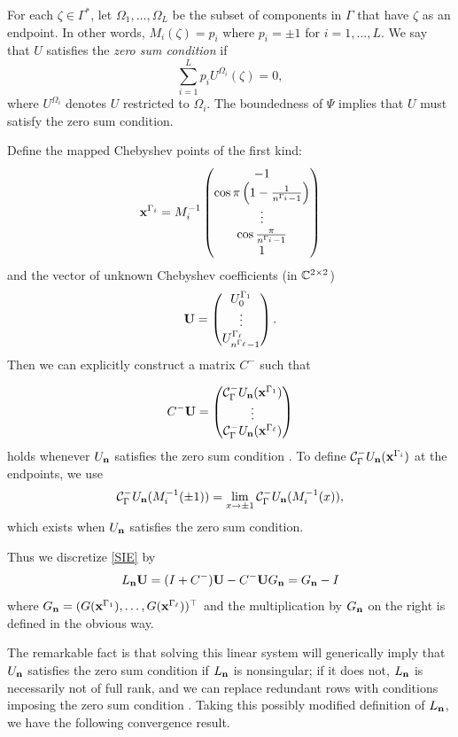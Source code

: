 \documentclass[11pt,fleqn]{article}
\numberwithin{equation}{section}
\begin{document}
  For each $\zeta \in \Gamma^*$, let $\Omega_1,\ldots,\Omega_L$ be the subset of components in
  $\Gamma$ that have $\zeta$ as an endpoint.  In other words,
  $M_i(\zeta) = p_i$ where $p_i = \pm 1$ for $i=1,\ldots, L$.
    We say that $U$ satisfies the {\it zero sum condition} if
    $$\sum_{i=1}^L p_i U^{\Omega_i}(\zeta) = 0,$$
%
where $U^{\Omega_i}$ denotes $U$ restricted to $\Omega_i$.
    The boundedness of $\Psi$ implies that $U$ must satisfy the zero sum condition.

Define the mapped Chebyshev points of the first kind:
%
    $${\bf x}^{\Gamma_i} = M_i^{-1}\begin{pmatrix}-1\cr\cos{\pi\left(1 - {1 \over n^{\Gamma_i}-1}\right)}\cr\vdots\cr\cos{\pi \over n^{\Gamma_i}-1}\cr1\end{pmatrix}$$
%
and the vector of
unknown Chebyshev coefficients (in ${\Bbb C}^{2 \times 2}$)
%
    $${\bf U} = \begin{pmatrix}U_0^{\Gamma_1}  \cr \vdots \cr U_{n^{\Gamma_\ell}-1}^{\Gamma_\ell} \end{pmatrix}.$$
%
Then we can explicitly construct a matrix $C^-$ such that

%
    $$C^-{\bf U} = \begin{pmatrix} {\cal C}_{\Gamma}^- U_{\bf n}({\bf x}^{\Gamma_1}) \cr \vdots \cr {\cal C}_{\Gamma}^-  U_{\bf n}({\bf x}^{\Gamma_\ell})\end{pmatrix}$$
holds whenever $U_{\bf n}$ satisfies the zero sum condition \cite{SORHFramework}.  To define ${\cal C}_{\Gamma}^- U_{\bf n}({\bf x}^{\Gamma_i})$ at the endpoints, we use
%
    $${\cal C}_{\Gamma}^- U_{\bf n}(M_{i}^{-1}(\pm 1)) = \lim_{x \rightarrow \pm 1} {\cal C}_{\Gamma}^- U_{\bf n}(M_i^{-1}(x)),$$
%
which exists when $U_{\bf n}$ satisfies the zero sum condition.


Thus we discretize \eqref{SIE} by
%
    $${ L}_{\bf n} {\bf U} = (I + C^-) {\bf U} - C^-{\bf U} G_{\bf n} = G_{\bf n} - I$$
%
where $G_{\bf n} = (G({\bf x}^{\Gamma_1}) , \ldots , G({\bf x}^{\Gamma_\ell}))^\top$  and the multiplication by $G_{\bf n}$ on the right is defined in the obvious way.

    The remarkable fact is that solving this linear system will generically imply that $U_{\bf n}$ satisfies the zero sum condition if $L_{\bf n}$ is nonsingular; if it does not, $L_{\bf n}$ is necessarily not of full rank, and we can replace redundant rows with conditions imposing the zero sum condition \cite{SORHFramework}.  Taking this possibly modified definition of $L_{\bf n}$, we have the following convergence result.
\end{document}
